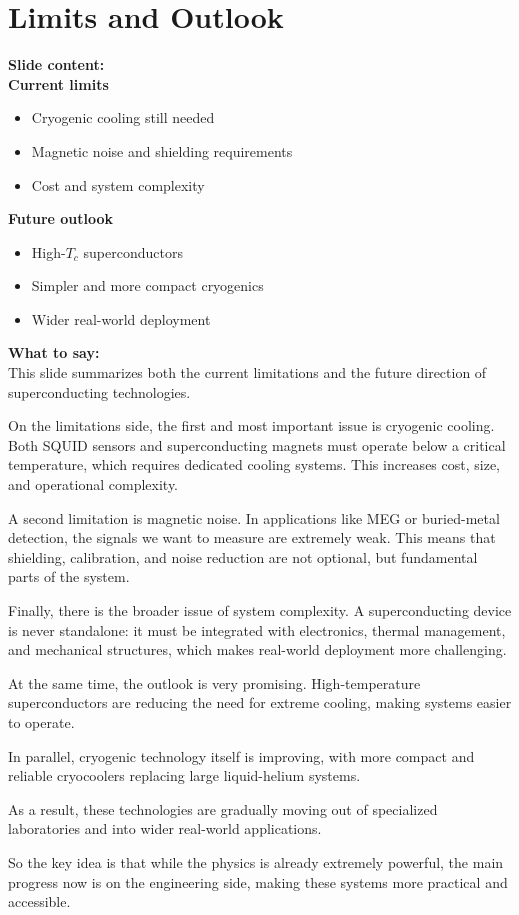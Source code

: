 \documentclass[11pt,a4paper]{article}
\newcommand{\points}[1]{{\color{accent}\textbf{Slide content:}}\\#1}
\newcommand{\speech}[1]{{\color{accent}\textbf{What to say:}}\\#1}
\begin{document}

\section{Limits and Outlook}

\points{
\textbf{Current limits}
\begin{itemize}
\item Cryogenic cooling still needed
\item Magnetic noise and shielding requirements
\item Cost and system complexity
\end{itemize}

\textbf{Future outlook}
\begin{itemize}
\item High-$T_c$ superconductors
\item Simpler and more compact cryogenics
\item Wider real-world deployment
\end{itemize}
}

\speech{
This slide summarizes both the current limitations and the future direction of superconducting technologies.

On the limitations side, the first and most important issue is cryogenic cooling. Both SQUID sensors and superconducting magnets must operate below a critical temperature, which requires dedicated cooling systems. This increases cost, size, and operational complexity.

A second limitation is magnetic noise. In applications like MEG or buried-metal detection, the signals we want to measure are extremely weak. This means that shielding, calibration, and noise reduction are not optional, but fundamental parts of the system.

Finally, there is the broader issue of system complexity. A superconducting device is never standalone: it must be integrated with electronics, thermal management, and mechanical structures, which makes real-world deployment more challenging.

At the same time, the outlook is very promising. High-temperature superconductors are reducing the need for extreme cooling, making systems easier to operate.

In parallel, cryogenic technology itself is improving, with more compact and reliable cryocoolers replacing large liquid-helium systems.

As a result, these technologies are gradually moving out of specialized laboratories and into wider real-world applications.

So the key idea is that while the physics is already extremely powerful, the main progress now is on the engineering side, making these systems more practical and accessible.
}
\end{document}
